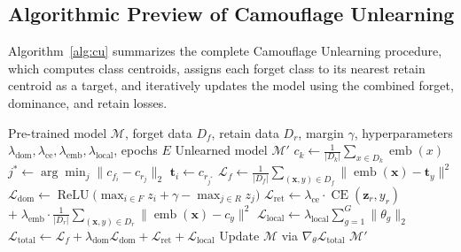 \subsection{Algorithmic Preview of Camouflage Unlearning}
Algorithm~\ref{alg:cu} summarizes the complete Camouflage Unlearning procedure, which computes class centroids, assigns each forget class to its nearest retain centroid as a target, and iteratively updates the model using the combined forget, dominance, and retain losses.

\begin{algorithm}[htbp]
\caption{Camouflage Unlearning}
\label{alg:cu}
\begin{algorithmic}[1]
\Require Pre-trained model $\mathcal{M}$, forget data $D_f$, retain data $D_r$, margin $\gamma$, hyperparameters $\lambda_{\text{dom}}, \lambda_{\text{ce}}, \lambda_{\text{emb}}, \lambda_{\text{local}}$, epochs $E$
\Ensure Unlearned model $\mathcal{M}'$
    \State $c_k \gets \tfrac{1}{|D_k|}\textstyle\sum_{x \in D_k} \operatorname{emb}(x)$ 
\EndFor
{}
    \State $j^* \gets \arg\min_j \|c_{f_i} - c_{r_j}\|_2$ 
    \State $\mathbf{t}_i \gets c_{r_{j^*}}$ 
\EndFor
{}
        \State {}
        \State $\mathcal{L}_f \gets \tfrac{1}{|D_f|}\textstyle\sum_{(\mathbf{x},y) \in D_f} \|\operatorname{emb}(\mathbf{x}) - \mathbf{t}_y\|^2$
        \State {}
        \State $\mathcal{L}_{\text{dom}} \gets \operatorname{ReLU}\bigl(\max_{i \in F} z_i + \gamma - \max_{j \in R} z_j\bigr)$
        \State {}
        \State $\mathcal{L}_{\text{ret}} \gets \lambda_{\text{ce}} \cdot \operatorname{CE}(\mathbf{z}_r, y_r)$
        \Statex \hspace{3.2em} $+ \; \lambda_{\text{emb}} \cdot \tfrac{1}{|D_r|}\textstyle\sum_{(\mathbf{x},y) \in D_r} \|\operatorname{emb}(\mathbf{x}) - c_y\|^2$
        \State $\mathcal{L}_{\text{local}} \gets \lambda_{\text{local}} \textstyle\sum_{g=1}^{G} \|\theta_g \|_2$ 
        \State $\mathcal{L}_{\text{total}} \gets \mathcal{L}_f + \lambda_{\text{dom}} \mathcal{L}_{\text{dom}} + \mathcal{L}_{\text{ret}} + \mathcal{L}_{\text{local}}$ 
        \State Update $\mathcal{M}$ via $\nabla_\theta \mathcal{L}_{\text{total}}$
    \EndFor
\EndFor
\State \Return $\mathcal{M}'$
\end{algorithmic}
\end{algorithm}